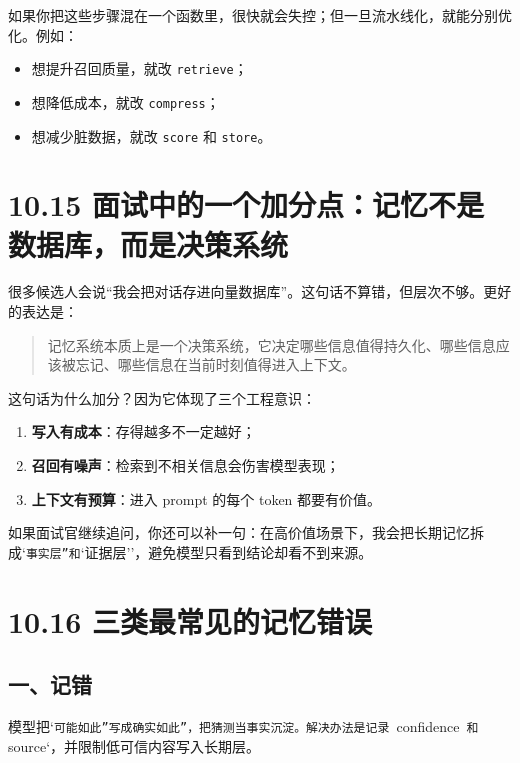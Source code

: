 如果你把这些步骤混在一个函数里，很快就会失控；但一旦流水线化，就能分别优化。例如：


\begin{itemize}[leftmargin=2em]
\item 想提升召回质量，就改 \texttt{retrieve}；
\item 想降低成本，就改 \texttt{compress}；
\item 想减少脏数据，就改 \texttt{score} 和 \texttt{store}。
\end{itemize}

\section{10.15 面试中的一个加分点：记忆不是数据库，而是决策系统}

很多候选人会说``我会把对话存进向量数据库''。这句话不算错，但层次不够。更好的表达是：


\begin{quote}
记忆系统本质上是一个决策系统，它决定哪些信息值得持久化、哪些信息应该被忘记、哪些信息在当前时刻值得进入上下文。\\
\end{quote}

这句话为什么加分？因为它体现了三个工程意识：


\begin{enumerate}[leftmargin=2em]
\item \textbf{写入有成本}：存得越多不一定越好；
\item \textbf{召回有噪声}：检索到不相关信息会伤害模型表现；
\item \textbf{上下文有预算}：进入 prompt 的每个 token 都要有价值。
\end{enumerate}

如果面试官继续追问，你还可以补一句：在高价值场景下，我会把长期记忆拆成`\texttt{事实层''和}`证据层''，避免模型只看到结论却看不到来源。


\section{10.16 三类最常见的记忆错误}

\subsection{一、记错}

模型把`\texttt{可能如此''写成}\texttt{确实如此''，把猜测当事实沉淀。解决办法是记录 }confidence\texttt{ 和 }source`，并限制低可信内容写入长期层。


